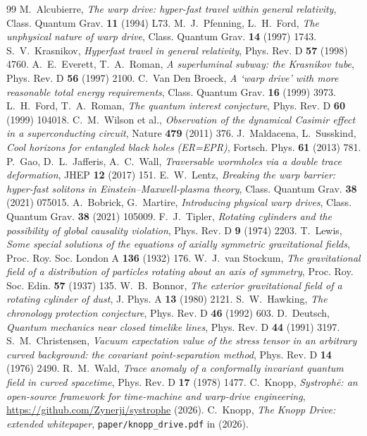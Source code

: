 \documentclass[11pt,a4paper]{article}
\begin{document}
\begin{thebibliography}{99}
M.~Alcubierre, \emph{The warp drive: hyper-fast travel within general relativity}, Class. Quantum Grav. \textbf{11} (1994) L73.
M.~J.~Pfenning, L.~H.~Ford, \emph{The unphysical nature of warp drive}, Class. Quantum Grav. \textbf{14} (1997) 1743.
S.~V.~Krasnikov, \emph{Hyperfast travel in general relativity}, Phys. Rev. D \textbf{57} (1998) 4760.
A.~E.~Everett, T.~A.~Roman, \emph{A superluminal subway: the Krasnikov tube}, Phys. Rev. D \textbf{56} (1997) 2100.
C.~Van Den Broeck, \emph{A `warp drive' with more reasonable total energy requirements}, Class. Quantum Grav. \textbf{16} (1999) 3973.
L.~H.~Ford, T.~A.~Roman, \emph{The quantum interest conjecture}, Phys. Rev. D \textbf{60} (1999) 104018.
C.~M.~Wilson et al., \emph{Observation of the dynamical Casimir effect in a superconducting circuit}, Nature \textbf{479} (2011) 376.
J.~Maldacena, L.~Susskind, \emph{Cool horizons for entangled black holes (ER=EPR)}, Fortsch. Phys. \textbf{61} (2013) 781.
P.~Gao, D.~L.~Jafferis, A.~C.~Wall, \emph{Traversable wormholes via a double trace deformation}, JHEP \textbf{12} (2017) 151.
E.~W.~Lentz, \emph{Breaking the warp barrier: hyper-fast solitons in Einstein--Maxwell-plasma theory}, Class. Quantum Grav. \textbf{38} (2021) 075015.
A.~Bobrick, G.~Martire, \emph{Introducing physical warp drives}, Class. Quantum Grav. \textbf{38} (2021) 105009.
F.~J.~Tipler, \emph{Rotating cylinders and the possibility of global causality violation}, Phys. Rev. D \textbf{9} (1974) 2203.
T.~Lewis, \emph{Some special solutions of the equations of axially symmetric gravitational fields}, Proc. Roy. Soc. London A \textbf{136} (1932) 176.
W.~J.~van Stockum, \emph{The gravitational field of a distribution of particles rotating about an axis of symmetry}, Proc. Roy. Soc. Edin. \textbf{57} (1937) 135.
W.~B.~Bonnor, \emph{The exterior gravitational field of a rotating cylinder of dust}, J. Phys. A \textbf{13} (1980) 2121.
S.~W.~Hawking, \emph{The chronology protection conjecture}, Phys. Rev. D \textbf{46} (1992) 603.
D.~Deutsch, \emph{Quantum mechanics near closed timelike lines}, Phys. Rev. D \textbf{44} (1991) 3197.
S.~M.~Christensen, \emph{Vacuum expectation value of the stress tensor in an arbitrary curved background: the covariant point-separation method}, Phys. Rev. D \textbf{14} (1976) 2490.
R.~M.~Wald, \emph{Trace anomaly of a conformally invariant quantum field in curved spacetime}, Phys. Rev. D \textbf{17} (1978) 1477.
C.~Knopp, \emph{Systroph\=e: an open-source framework for time-machine and warp-drive engineering}, \url{https://github.com/Zynerji/systrophe} (2026).
C.~Knopp, \emph{The Knopp Drive: extended whitepaper}, \texttt{paper/knopp\_drive.pdf} in \cite{SystropheRepo} (2026).
\end{thebibliography}
\end{document}

